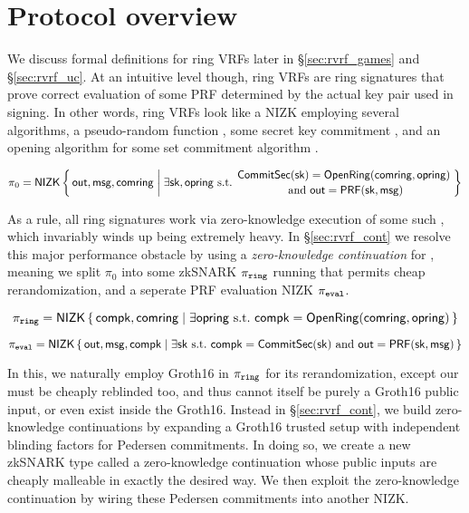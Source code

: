 \section{Protocol overview}
\label{sec:overview}


We discuss formal definitions for ring VRFs later in \S\ref{sec:rvrf_games} and \S\ref{sec:rvrf_uc}.
At an intuitive level though, ring VRFs are ring signatures that prove
correct evaluation of some PRF determined by the actual key pair used in signing.
In other words, ring VRFs look like a NIZK employing several algorithms,
a pseudo-random function \PRF, some secret key commitment \CommitSec,
and an opening algorithm \OpenRing for some set commitment algorithm \CommitRing.

$$ \pi_0 = \NIZK \Setst{ \mathsf{out}, \msg, \comring }{
    \exists \sk, \openring \textrm{\ s.t.\ } 
    \genfrac{}{}{0pt}{}{
        \CommitSec(\sk) = \OpenRing(\comring,\openring)
    }{ \textrm{ and }
        \mathsf{out} = \PRF(\sk,\msg)
    }
} $$

As a rule, all ring signatures work via zero-knowledge execution of
some such \OpenRing, which invariably winds up being extremely heavy.
In \S\ref{sec:rvrf_cont} we resolve this major performance
obstacle by using a {\em zero-knowledge continuation} for \OpenRing,
meaning we split $\pi_0$ into some zkSNARK $\pi_{\mathtt{ring}}$ running \OpenRing that
permits cheap rerandomization, and a seperate PRF evaluation NIZK $\pi_{\mathtt{eval}}$.

$$ \piring = \NIZK \Setst{ \compk, \comring }{
    \exists \openring \textrm{\ s.t.\ } 
    \compk = \OpenRing(\comring,\openring)
} $$

$$ \pieval = \NIZK \Setst{ \mathsf{out}, \msg, \compk }{
    \exists \sk \textrm{\ s.t.\ }
    \compk = \CommitSec(\sk) \textrm{ and }
    \mathsf{out} = \PRF(\sk,\msg)
} $$

In this, we naturally employ Groth16 in $\pi_{\mathtt{ring}}$ for its rerandomization,
except our \compk must be cheaply reblinded too, and thus cannot itself
be purely a Groth16 public input, or even exist inside the Groth16.
Instead in \S\ref{sec:rvrf_cont}, we build zero-knowledge continuations
by expanding a Groth16 trusted setup with independent blinding factors
for Pedersen commitments.  In doing so, we create a new zkSNARK type called
a zero-knowledge continuation whose public inputs are cheaply malleable
 in exactly the desired way.
We then exploit the zero-knowledge continuation by wiring these
Pedersen commitments into another NIZK.  

